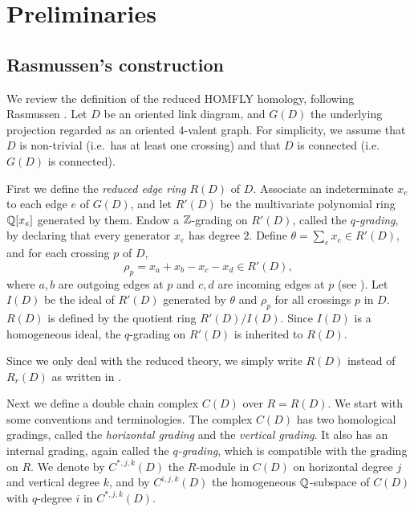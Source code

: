 \section{Preliminaries} \label{sec:prelim}

\subsection{Rasmussen's construction}

We review the definition of the reduced HOMFLY homology, following Rasmussen \cite{Ras15}.
% 
Let $D$ be an oriented link diagram, and $G(D)$ the underlying projection
regarded as an oriented $4$-valent graph.
For simplicity, we assume that $D$ is non-trivial (i.e.\ has at least one crossing) and that $D$ is connected (i.e.\ $G(D)$ is connected).

First we define the \textit{reduced edge ring} $R(D)$ of $D$.
Associate an indeterminate $x_e$ to each edge $e$ of $G(D)$, and let $R'(D)$ be the multivariate polynomial ring $\mathbb{Q}[x_e]$ generated by them.
Endow a $\mathbb{Z}$-grading on $R'(D)$, called the \textit{$q$-grading}, by declaring that every generator $x_e$ has degree $2$.
% 
Define $\theta = \sum_e x_e \in R'(D) $, and for each crossing $p$ of $D$,
\[
    \rho_p = x_a+x_b-x_c-x_d \in R'(D),
\]
where $a, b$ are outgoing edges at $p$ and $c,d$ are incoming edges at $p$ (see ).
Let $I(D)$ be the ideal of $R'(D)$ generated by $\theta$ and $\rho_{p}$ for all crossings $p$ in $D$.
$R(D)$ is defined by the quotient ring $R'(D)/I(D)$.
Since $I(D)$ is a homogeneous ideal, the $q$-grading on  $R'(D)$ is inherited to $R(D)$.

\begin{remark}
    Since we only deal with the reduced theory, we simply write $R(D)$ instead of $R_r(D)$ as written in \cite{Ras15}.
\end{remark}

Next 
we define a double chain complex $C(D)$ over $R = R(D)$. We start with some conventions and terminologies.
The complex $C(D)$ has two homological gradings, called the \textit{horizontal grading} and the \textit{vertical grading}.
It also has an internal grading, again called the \textit{$q$-grading}, which is compatible with the grading on $R$.
We denote by $C^{*,j,k}(D)$ the $R$-module in $C(D)$ on horizontal degree $j$ and vertical degree $k$, and by $C^{i,j,k}(D)$ the homogeneous $\mathbb{Q}$-subspace of $C(D)$ with $q$-degree $i$ in $C^{*,j,k}(D)$.

